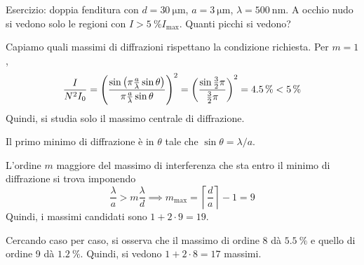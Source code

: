 Esercizio: doppia fenditura con $d = \qty{30}{\micro\metre}$, $a = \qty{3}{\micro\metre}$, $\lambda = \qty{500}{\nano\metre}$.
A occhio nudo si vedono solo le regioni con $I > \qty{5}{\percent} I_\text{max}$.
Quanti picchi si vedono?

Capiamo quali massimi di diffrazioni rispettano la condizione richiesta.
Per $m = 1$,
\begin{equation}
    \frac{I}{N^2 I_0} = \left( \frac{\sin\left( \pi \frac{a}{\lambda} \sin\theta \right)}{\pi \frac{a}{\lambda} \sin\theta} \right)^2
    = \left( \frac{\sin \frac{3}{2} \pi}{\frac{3}{2} \pi} \right)^2
    = \qty{4.5}{\percent} < \qty{5}{\percent}
\end{equation}
Quindi, si studia solo il massimo centrale di diffrazione.

Il primo minimo di diffrazione è in $\theta$ tale che $\sin \theta = \lambda / a$.

L'ordine $m$ maggiore del massimo di interferenza che sta entro il minimo di diffrazione si trova imponendo
\begin{equation}
    \frac{\lambda}{a} > m \frac{\lambda}{d}
    \implies
    m_\text{max} = \left\lceil \frac{d}{a} \right\rceil - 1 = 9
\end{equation}
Quindi, i massimi candidati sono $1 + 2 \cdot 9 = 19$.

Cercando caso per caso, si osserva che il massimo di ordine 8 dà $\qty{5.5}{\percent}$ e quello di ordine 9 dà $\qty{1.2}{\percent}$.
Quindi, si vedono $1 + 2 \cdot 8 = 17$ massimi.
